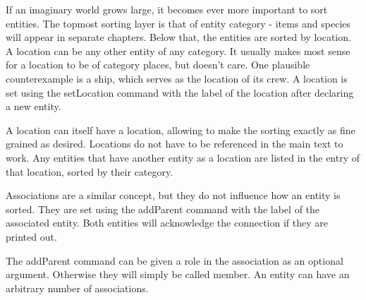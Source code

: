 \documentclass[openany]{book}
\begin{document}
If an imaginary world grows large, it becomes ever more important to sort entities. The topmost sorting layer is that of entity category - items and species will appear in separate chapters. Below that, the entities are sorted by location. A location can be any other entity of any category. It usually makes most sense for a location to be of category places, but \LoreTex{} doesn't care. One plausible counterexample is a ship, which serves as the location of its crew. A location is set using the setLocation command with the label of the location after declaring a new entity.

A location can itself have a location, allowing to make the sorting exactly as fine grained as desired. Locations do not have to be referenced in the main text to work. Any entities that have another entity as a location are listed in the entry of that location, sorted by their category.








Associations are a similar concept, but they do not influence how an entity is sorted. They are set using the addParent command with the label of the associated entity. Both entities will acknowledge the connection if they are printed out.

The addParent command can be given a role in the association as an optional argument. Otherwise they will simply be called member. An entity can have an arbitrary number of associations.









\automatedChapters{}
\end{document}
